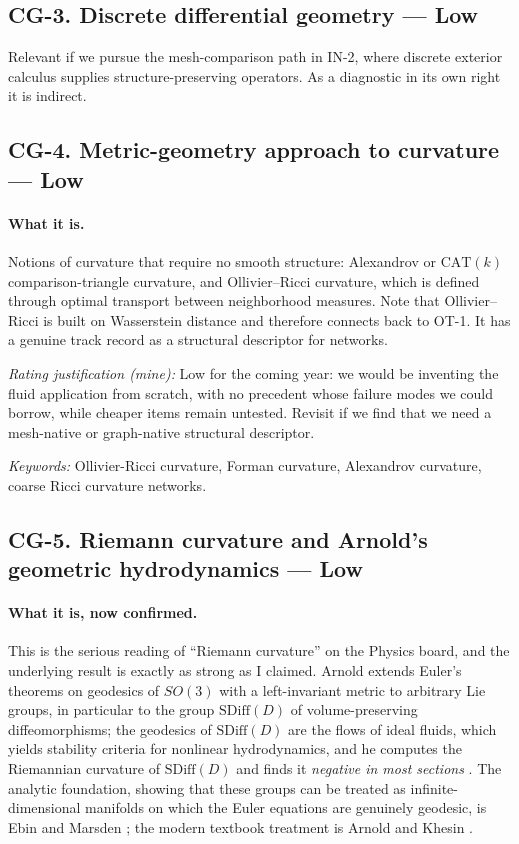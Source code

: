 \documentclass[11pt]{article}
\newcommand{\Low}{\textbf{Low}}
\newcommand{\keywords}[1]{\par\smallskip\noindent\textit{Keywords:} #1}
\newcommand{\rating}[1]{\par\smallskip\noindent\textit{Rating justification (mine):} #1}
\begin{document}
\subsection{CG-3. Discrete differential geometry --- \Low{}}

Relevant if we pursue the mesh-comparison path in IN-2, where discrete exterior calculus
supplies structure-preserving operators. As a diagnostic in its own right it is indirect.

\subsection{CG-4. Metric-geometry approach to curvature --- \Low{}}

\paragraph{What it is.} Notions of curvature that require no smooth structure: Alexandrov or
$\mathrm{CAT}(k)$ comparison-triangle curvature, and Ollivier--Ricci curvature, which is
defined through optimal transport between neighborhood measures. Note that Ollivier--Ricci
is built on Wasserstein distance and therefore connects back to OT-1. It has a genuine track
record as a structural descriptor for networks.

\rating{Low for the coming year: we would be inventing the fluid application from scratch,
with no precedent whose failure modes we could borrow, while cheaper items remain untested.
Revisit if we find that we need a mesh-native or graph-native structural descriptor.}

\keywords{Ollivier-Ricci curvature, Forman curvature, Alexandrov curvature, coarse Ricci
curvature networks.}

\subsection{CG-5. Riemann curvature and Arnold's geometric hydrodynamics --- \Low{}}

\paragraph{What it is, now confirmed.} This is the serious reading of ``Riemann curvature''
on the Physics board, and the underlying result is exactly as strong as I claimed. Arnold
extends Euler's theorems on geodesics of $SO(3)$ with a left-invariant metric to arbitrary
Lie groups, in particular to the group $\mathrm{SDiff}(D)$ of volume-preserving
diffeomorphisms; the geodesics of $\mathrm{SDiff}(D)$ are the flows of ideal fluids, which
yields stability criteria for nonlinear hydrodynamics, and he computes the Riemannian
curvature of $\mathrm{SDiff}(D)$ and finds it \emph{negative in most sections}
\cite{arnold1966}. The analytic foundation, showing that these groups can be treated as
infinite-dimensional manifolds on which the Euler equations are genuinely geodesic, is Ebin
and Marsden \cite{ebinmarsden1970}; the modern textbook treatment is Arnold and Khesin
\cite{arnoldkhesin1998}.
\end{document}
